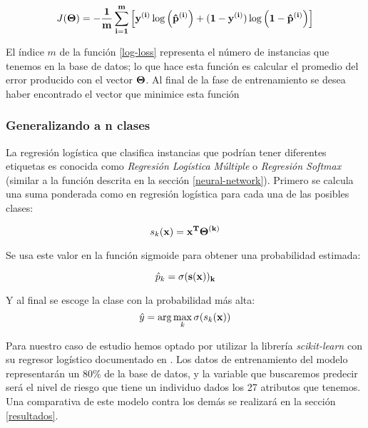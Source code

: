\documentclass[journal]{IEEEtran}                                                          %
\begin{document}
            \begin{equation} \label{log-loss}
                J(\bf{\Theta}) = - \frac{1}{m} \sum_{i=1}^{m} \left[y^{(i)} \log \left(\hat{p}^{(i)}\right) + (1 - y^{(i)}) \log \left(1 - \hat{p}^{(i)} \right) \right]
            \end{equation}

            El índice $m$ de la función \ref{log-loss} representa el número de instancias que tenemos en la base de datos; lo que hace esta función es calcular el promedio del error producido con el vector $\bf{\Theta}$. Al final de la fase de entrenamiento se desea haber encontrado el vector que minimice esta función

            \subsubsection{Generalizando a n clases}

                La regresión logística que clasifica instancias que podrían tener diferentes etiquetas es conocida como \emph{Regresión Logística Múltiple} o \emph{Regresión Softmax} (similar a la función descrita en la sección \ref{neural-network}). Primero se calcula una suma ponderada como en regresión logística para cada una de las posibles clases:

                \begin{equation}
                    s_k(\bf{x}) = \bf{x}^T \Theta^{(k)}
                \end{equation}

                Se usa este valor en la función sigmoide para obtener una probabilidad estimada:

                \begin{equation}
                    \hat{p}_k = \sigma(\bf{s}(\bf{x}))_k
                \end{equation}

                Y al final se escoge la clase con la probabilidad más alta:
                \begin{equation}
                    \hat{y} = \arg\max_k \sigma(s_k(\bf{x}))
                \end{equation}
            
            Para nuestro caso de estudio hemos optado por utilizar la librería \emph{scikit-learn} con su regresor logístico documentado en \cite{sci-kit-learn-no-dateB}. Los datos de entrenamiento del modelo representarán un 80\% de la base de datos, y la variable que buscaremos predecir será el nivel de riesgo que tiene un individuo dados los 27 atributos que tenemos. Una comparativa de este modelo contra los demás se realizará en la sección \ref{resultados}.
\end{document}
